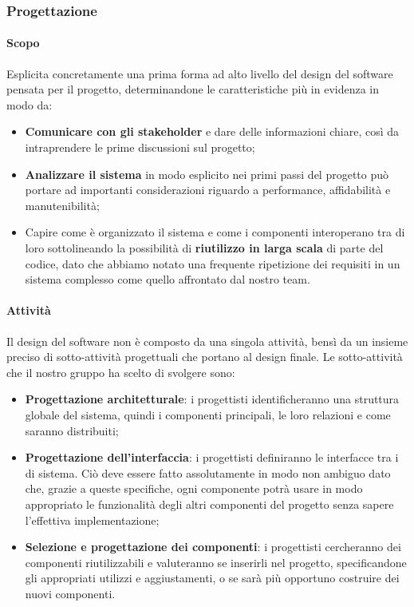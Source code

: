 \subsubsection{Progettazione}
\paragraph{Scopo}\Spazio
Esplicita concretamente una prima forma ad alto livello del design del software pensata per il progetto, determinandone le caratteristiche più in evidenza in modo da:
	\begin{itemize}
	\item \textbf{{Comunicare con gli stakeholder}} e dare delle informazioni chiare, così da intraprendere le prime discussioni sul progetto;
	\item \textbf{{Analizzare il sistema}} in modo esplicito nei primi passi del progetto può portare ad importanti considerazioni riguardo a performance, affidabilità e manutenibilità;
	\item Capire come è organizzato il sistema  e come i componenti interoperano tra di loro sottolineando la possibilità di \textbf{{riutilizzo in larga scala}} di parte del codice, dato che abbiamo notato una frequente ripetizione dei requisiti in un sistema complesso come quello affrontato dal nostro team.
	\end{itemize}
\paragraph{Attività}\Spazio
Il design del software non è composto da una singola attività, bensì da un insieme preciso di sotto-attività progettuali che portano al design finale.
Le sotto-attività che il nostro gruppo ha scelto di svolgere sono:
	\begin{itemize}
	\item\textbf{{Progettazione architetturale}}: i progettisti identificheranno una struttura globale del sistema, quindi i componenti principali, le loro relazioni e come saranno distribuiti;
	\item\textbf{{Progettazione dell'interfaccia}}: i progettisti definiranno le interfacce tra i  di sistema. Ciò deve essere fatto assolutamente in modo non ambiguo dato che, grazie a queste specifiche, ogni componente potrà usare in modo appropriato le funzionalità degli altri componenti del progetto senza sapere l'effettiva implementazione;
	\item\textbf{{Selezione e progettazione dei componenti}}: i progettisti cercheranno dei componenti riutilizzabili e valuteranno se inserirli nel progetto, specificandone gli appropriati utilizzi e aggiustamenti, o se sarà più opportuno costruire dei nuovi componenti.
\end{itemize}

